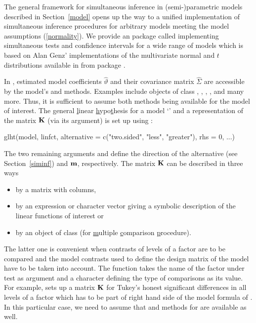\documentclass[12pt]{article}
\begin{document}
The general framework for simultaneous inference in 
(semi-)parametric models described in Section~\ref{model}
opens up the way to a unified implementation of simultaneous inference
procedures for arbitrary models meeting the model assumptions 
(\ref{normality}). We provide an \RR{} \citep{R2007} package called 
 \citep{pkg:multcomp} implementing
simultaneous tests and confidence intervals for a wide range of models which
is based on Alan Genz' implementations of the multivariate
normal and $t$ distributions available in \RR{} from package  
\citep{pkg:mvtnorm,Rnews:Hothorn+Bretz+Genz:2001}. 

In \RR, estimated model coefficients $\hat{\vartheta}$ and their covariance 
matrix $\hat{\Sigma}$ are accessible by the model's  
and  methods. Examples include objects of class ,
, , ,  and many more.
Thus, it is sufficient to assume both
methods being available for the model of interest. The \underline{g}eneral
\underline{l}inear \underline{h}ypo\underline{t}hesis for a model 
`' and a representation of the matrix $\mathbf{K}$ (via its
 argument)
is set up using :
\begin{Sinput}
glht(model, linfct, alternative = c("two.sided", "less", "greater"), 
     rhs = 0, ...)
\end{Sinput}
The two remaining arguments
 and  define the direction
of the alternative (see Section~\ref{siminf}) and $\mathbf{m}$, respectively.
The matrix $\mathbf{K}$ can be described in three ways
\begin{itemize}
\item by a matrix with  columns,
\item by an expression or character vector giving a symbolic description 
      of the linear functions of interest or
\item by an object of class  
      (for \underline{m}ultiple \underline{c}omparison \underline{p}rocedure).
\end{itemize}
The latter one is convenient when contrasts of levels of a factor are
to be compared and the model contrasts used to define the design matrix
of the model have to be taken into account. The  function
takes the name of the factor under test as argument and a character 
defining the type of comparisons as its value. For example,
 sets up a matrix $\mathbf{K}$ for Tukey's honest
significant differences in all levels of a factor 
which has to be part of right hand side of the model formula
of . In this particular case, we need to assume
that  and  methods for 
 are available as well. 
\end{document}
